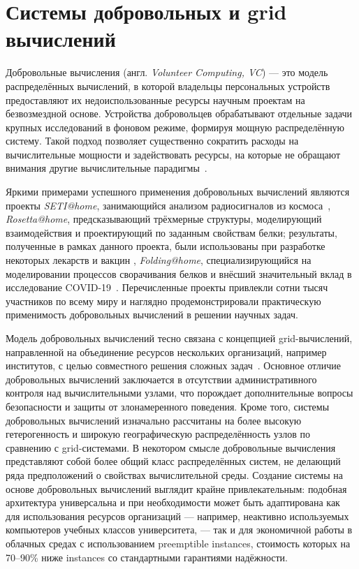 \documentclass[a4paper,12pt]{extarticle}
\begin{document}
\section{Системы добровольных и grid вычислений}

Добровольные вычисления (англ. \textit{Volunteer Computing, VC}) — это модель распределённых вычислений, в которой владельцы персональных устройств предоставляют их недоиспользованные ресурсы научным проектам на безвозмездной основе.
Устройства добровольцев обрабатывают отдельные задачи крупных исследований в фоновом режиме, формируя мощную распределённую систему.
Такой подход позволяет существенно сократить расходы на вычислительные мощности и задействовать ресурсы, на которые не обращают внимания другие вычислительные парадигмы~\cite{anderson2020boinc}.

Яркими примерами успешного применения добровольных вычислений являются проекты
\textit{SETI@home}, занимающийся анализом радиосигналов из космоса~\cite{Anderson2002},
\textit{Rosetta@home}, предсказывающий трёхмерные структуры, моделирующий взаимодействия и проектирующий по заданным свойствам белки; результаты, полученные в рамках данного проекта, были использованы при разработке некоторых лекарств и вакцин \cite{RosettaHomeWiki},
\textit{Folding@home}, специализирующийся на моделировании процессов сворачивания белков и внёсший значительный вклад в исследование COVID-19~\cite{Zimmerman2021}.
Перечисленные проекты привлекли сотни тысяч участников по всему миру и наглядно продемонстрировали практическую применимость добровольных вычислений в решении научных задач.

Модель добровольных вычислений тесно связана с концепцией grid-вычислений, направленной на объединение ресурсов нескольких организаций, например институтов, с целью совместного решения сложных задач~\cite{Foster2001}.
Основное отличие добровольных вычислений заключается в отсутствии административного контроля над вычислительными узлами, что порождает дополнительные вопросы безопасности и защиты от злонамеренного поведения.
Кроме того, системы добровольных вычислений изначально рассчитаны на более высокую гетерогенность и широкую географическую распределённость узлов по сравнению с grid-системами.
В некотором смысле добровольные вычисления представляют собой более общий класс распределённых систем, не делающий ряда предположений о свойствах вычислительной среды.
Создание системы на основе добровольных вычислений выглядит крайне привлекательным: подобная архитектура универсальна и при необходимости может быть адаптирована как для использования ресурсов организаций — например, неактивно используемых компьютеров учебных классов университета, — так и для экономичной работы в облачных средах с использованием preemptible instances, стоимость которых на 70–90\% ниже instances со стандартными гарантиями надёжности.
\end{document}
